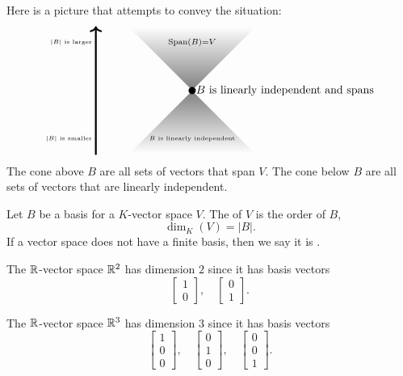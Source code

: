 \documentclass{ximera}
\begin{document}
Here is a picture that attempts to convey the situation:
\[
\begin{tikzpicture}
  \draw[white,thin,shading = axis, top color = white, bottom color = gray] (-2,2) -- (0,0)-- (2,2) -- (-2,2) -- cycle;
  \draw[white,thin,shading = axis, bottom color = white, top color = gray] (-2,-2) -- (0,0)-- (2,-2) -- (-2,-2) -- cycle;
  \filldraw (0,0) circle (3pt);
  \node[right] at (0,0) {$B$ is linearly independent and spans};
  \node at (0,1.5) {$\scriptstyle \Span(B) = V$};
  \node at (0,-1.5) {\tiny $B$  is linearly independent};
  \draw[->,ultra thick] (-3,-2) -- (-3,2);
  \node[left] at (-3,-1.5) {\text{\tiny $|B|$ is smaller}};
  \node[left] at (-3,1.5) {\text{\tiny $|B|$ is larger}};
\end{tikzpicture}
\]
The cone above $B$ are all sets of vectors that span $V$. The cone
below $B$ are all sets of vectors that are linearly independent.



\begin{definition}
  Let $B$ be a basis for a $K$-vector space $V$. The  of $V$ is the order of $B$,
  \[
  \dim_K(V) = |B|.
  \]
  If a vector space does not have a finite basis, then we say it is
  .
\end{definition}

\begin{example}
  The $\mathbb R$-vector space $\mathbb R^2$ has dimension $2$ since it has basis vectors
  \[
  \begin{bmatrix}
    1\\
    0
  \end{bmatrix},\quad
  \begin{bmatrix}
    0\\
    1
  \end{bmatrix}.
  \]
\end{example}



\begin{example}
  The $\mathbb R$-vector space $\mathbb R^3$ has dimension $3$ since it has basis vectors
  \[
  \begin{bmatrix}
    1\\
    0\\
    0
  \end{bmatrix},\quad
  \begin{bmatrix}
    0\\
    1\\
    0
  \end{bmatrix},\quad
   \begin{bmatrix}
    0\\
    0\\
    1
  \end{bmatrix}.
  \]
\end{example}
\end{document}
